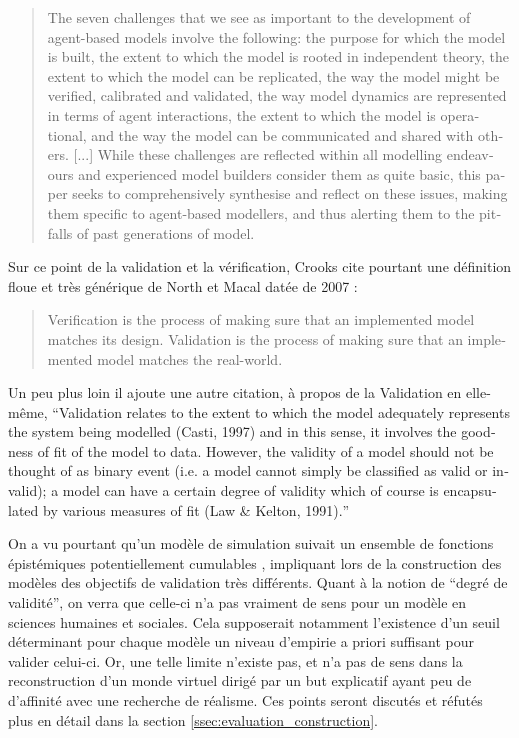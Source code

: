 \foreignblockquote{english}[{\cite[93-94]{Crooks2012}}]{The seven challenges that we see as important to the development of agent-based models involve the following: the purpose for which the model is built, the extent to which the model is rooted in independent theory, the extent to which the model can be replicated, the way the model might be verified, calibrated and validated, the way model dynamics are represented in terms of agent interactions, the extent to which the model is operational, and the way the model can be communicated and shared with others. [...] While these challenges are reflected within all modelling endeavours and experienced model builders consider them as quite basic, this paper seeks to comprehensively synthesise and reflect on these issues, making them specific to agent-based modellers, and thus alerting them to the pitfalls of past generations of model.}

Sur ce point de la validation et la vérification, Crooks cite pourtant une définition floue et très générique de North et Macal datée de 2007 :

\foreignblockquote{english}[\cite{Crooks2012}]{ Verification is the process of making sure that an implemented model matches its design. Validation is the process of making sure that an implemented model matches the real-world.}. Un peu plus loin il ajoute une autre citation, à propos de la Validation en elle-même, \foreignquote{english}{Validation relates to the extent to which the model adequately represents the system being modelled (Casti, 1997) and in this sense, it involves the goodness of fit of the model to data. However, the validity of a model should not be thought of as binary event (i.e. a model cannot simply be classified as valid or invalid); a model can have a certain degree of validity which of course is encapsulated by various measures of fit (Law \& Kelton, 1991).}

On a vu pourtant qu'un modèle de simulation suivait un ensemble de fonctions épistémiques potentiellement cumulables \autocite{Varenne2013b}, impliquant lors de la construction des modèles des objectifs de validation très différents. Quant à la notion de \enquote{degré de validité}, on verra que celle-ci n'a pas vraiment de sens pour un modèle en sciences humaines et sociales. Cela supposerait notamment l'existence d'un seuil déterminant pour chaque modèle un niveau d'empirie a priori suffisant pour valider celui-ci. Or, une telle limite n'existe pas, et n'a pas de sens dans la reconstruction d'un monde virtuel dirigé par un but explicatif ayant peu de d'affinité avec une recherche de réalisme. Ces points seront discutés et réfutés plus en détail dans la section \ref{ssec:evaluation_construction}.

